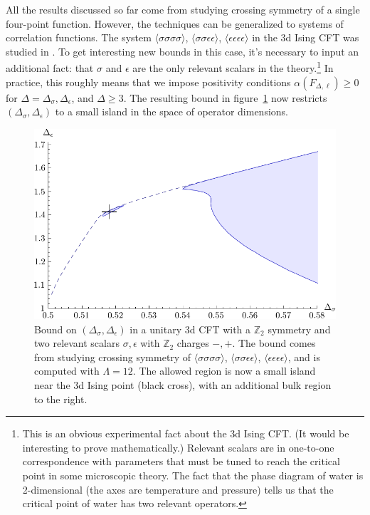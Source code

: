 \documentclass[11pt]{ws-rv9x6}
\newcommand\e\epsilon
\newcommand\<\langle
\renewcommand\>\rangle
\newcommand\Z{\mathbb{Z}}
\renewcommand\.{\cdot}
\newcommand\s\sigma
\newcommand\De{\Delta}
\begin{document}
All the results discussed so far come from studying crossing symmetry of a single four-point function.  However, the techniques can be generalized to systems of correlation functions. The system $\<\s\s\s\s\>$, $\<\s\s\e\e\>$, $\<\e\e\e\e\>$ in the 3d Ising CFT was studied in \cite{Kos:2014bka}.  To get interesting new bounds in this case, it's necessary to input an additional fact: that $\s$ and $\e$ are the only relevant scalars in the theory.\footnote{This is an obvious experimental fact about the 3d Ising CFT. (It would be interesting to prove mathematically.)  Relevant scalars are in one-to-one correspondence with parameters that must be tuned to reach the critical point in some microscopic theory.  The fact that the phase diagram of water is 2-dimensional (the axes are temperature and pressure) tells us that the critical point of water has two relevant operators.}  In practice, this roughly means that we impose positivity conditions $\alpha(F_{\De,\ell})\geq 0$ for $\De=\De_\s,\De_\e$, and $\De\geq 3$.  The resulting bound in figure~\ref{fig:multicorrelator3d} now restricts $(\De_\s,\De_\e)$ to a small island in the space of operator dimensions.

\begin{figure}[hpt]
\begin{center}
\includegraphics[width=\textwidth]{multiCorrelator3dBound}
\end{center}
\caption{\label{fig:multicorrelator3d} Bound on $(\De_\s,\De_\e)$ in a unitary 3d CFT with a $\Z_2$ symmetry and two relevant scalars $\s,\e$ with $\Z_2$ charges $-,+$.  The bound comes from studying crossing symmetry of $\<\s\s\s\s\>$, $\<\s\s\e\e\>$, $\<\e\e\e\e\>$, and is computed with $\Lambda=12$.  The allowed region is now a small island near the 3d Ising point (black cross), with an additional bulk region to the right.}
\end{figure}
\end{document}
